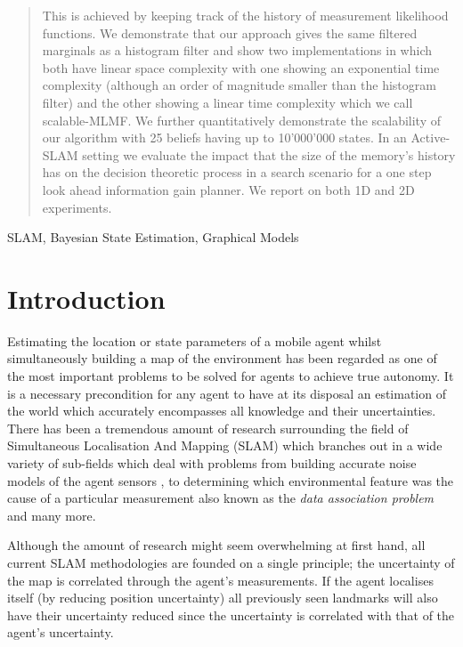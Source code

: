 \documentclass[review]{elsarticle}
\numberwithin{equation}{section}
\begin{document}
\begin{frontmatter}
\begin{abstract}
This is achieved by keeping track of the history of measurement likelihood 
functions. We demonstrate that our approach gives the same filtered marginals as a histogram filter and show two implementations in which
both have linear space complexity with one showing an exponential time complexity (although an order of magnitude smaller
than the histogram filter) and the other showing a linear time complexity which we call scalable-MLMF. We further quantitatively  demonstrate 
the scalability of our algorithm with 25 beliefs having up to 10'000'000 states. In an Active-SLAM setting we evaluate the impact that the size of the 
memory's history has on the decision theoretic process in a search scenario for a one step look ahead information gain planner.
We report on both 1D and 2D experiments.
\end{abstract}

\begin{keyword}
SLAM, Bayesian State Estimation, Graphical Models
\end{keyword}

\end{frontmatter}
\newpage
\linenumbers

\section{Introduction}

Estimating the location or state parameters of a mobile agent whilst simultaneously building a map of the environment has been
regarded as one of the most important problems to be solved for agents to achieve true autonomy. It is a necessary precondition for 
any agent to have at its disposal an estimation of the world which accurately encompasses all knowledge and their uncertainties. There has 
been a tremendous amount of research surrounding the field of Simultaneous Localisation And Mapping (SLAM) which branches out in a wide variety of sub-fields 
which deal with problems from building accurate noise models of the agent sensors \cite{Plagemann07gaussianbeam}, to determining which environmental 
feature was the cause of a particular measurement also known as the \textit{data association problem}\cite{DataAssociation2003} and many more. 


Although the amount of research might seem overwhelming at first hand, all current SLAM methodologies are founded on a single principle; 
the uncertainty of the map is correlated through the agent's measurements. If the agent localises itself (by reducing position uncertainty)
all previously seen landmarks will also have their uncertainty reduced since the uncertainty is correlated with that of the agent's uncertainty.
\end{document}
